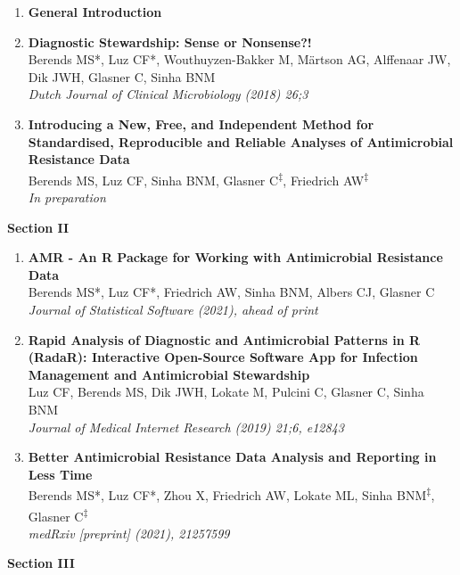\documentclass[
]{book}
\begin{document}
\begin{enumerate}
\def\labelenumi{\arabic{enumi}.}
\item
  \textbf{General Introduction}
\item
  \textbf{Diagnostic Stewardship: Sense or Nonsense?!}\\
  Berends MS*, Luz CF*, Wouthuyzen-Bakker M, Märtson AG, Alffenaar JW, Dik JWH, Glasner C, Sinha BNM\\
  \emph{Dutch Journal of Clinical Microbiology (2018) 26;3}
\item
  \textbf{Introducing a New, Free, and Independent Method for Standardised, Reproducible and Reliable Analyses of Antimicrobial Resistance Data}\\
  Berends MS, Luz CF, Sinha BNM, Glasner C\textsuperscript{‡}, Friedrich AW\textsuperscript{‡}\\
  \emph{In preparation}
\end{enumerate}

\textbf{Section II}

\begin{enumerate}
\def\labelenumi{\arabic{enumi}.}
\setcounter{enumi}{3}
\item
  \textbf{AMR - An R Package for Working with Antimicrobial Resistance Data}\\
  Berends MS*, Luz CF*, Friedrich AW, Sinha BNM, Albers CJ, Glasner C\\
  \emph{Journal of Statistical Software (2021), ahead of print}
\item
  \textbf{Rapid Analysis of Diagnostic and Antimicrobial Patterns in R (RadaR): Interactive Open-Source Software App for Infection Management and Antimicrobial Stewardship}\\
  Luz CF, Berends MS, Dik JWH, Lokate M, Pulcini C, Glasner C, Sinha BNM\\
  \emph{Journal of Medical Internet Research (2019) 21;6, e12843}
\item
  \textbf{Better Antimicrobial Resistance Data Analysis and Reporting in Less Time}\\
  Berends MS*, Luz CF*, Zhou X, Friedrich AW, Lokate ML, Sinha BNM\textsuperscript{‡}, Glasner C\textsuperscript{‡}\\
  \emph{medRxiv {[}preprint{]} (2021), 21257599}
\end{enumerate}

\textbf{Section III}
\end{document}

